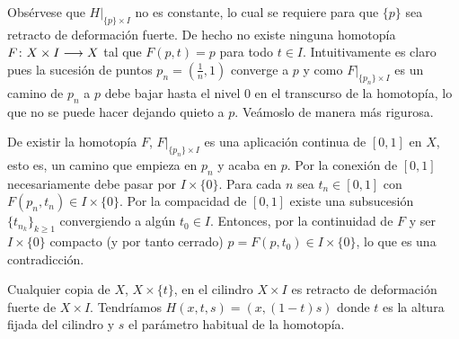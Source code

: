 \documentclass[GTS.tex]{subfiles}
\begin{document}
\begin{ej}
Obsérvese que $H\big|_{\{p\}\times I}$ no es constante, lo cual se requiere para que $\{p\}$ sea retracto de deformación fuerte. De hecho no existe ninguna homotopía $F\colon{X\times I}\longrightarrow{X}$ tal que $F(p,t)=p$ para todo $t\in I$. Intuitivamente es claro pues la sucesión de puntos $p_n=\left(\frac{1}{n},1\right)$ converge a $p$ y como $F\big|_{\{p_n\}\times I}$ es un camino de $p_n$ a $p$  debe bajar hasta el nivel $0$ en el transcurso de la homotopía, lo que no se puede hacer dejando quieto a $p$. Veámoslo de manera más rigurosa.

De existir la homotopía $F$, $F\big|_{\{p_n\}\times I}$ es una aplicación continua de $[0,1]$ en $X$, esto es, un camino que empieza en $p_n$ y acaba en $p$. Por la conexión de $[0,1]$ necesariamente debe pasar por $I\times\{0\}$. Para cada $n$ sea $t_n\in[0,1]$ con $F(p_n,t_n)\in I\times\{0\}$. Por la compacidad de $[0,1]$ existe una subsucesión $\{t_{n_k}\}_{k\geq 1}$ convergiendo a algún $t_0\in I$. Entonces, por la continuidad de $F$ y ser $I\times\{0\}$ compacto (y por tanto cerrado) $p=F(p,t_0)\in I\times\{0\}$, lo que es una contradicción.
\end{ej}

\begin{ej}Cualquier copia de $X$, $X\times\{t\}$, en el cilindro $X\times I$ es retracto de deformación fuerte de $X\times I$. Tendríamos $H(x,t,s)=(x,(1-t)s)$ donde $t$ es la altura fijada del cilindro y $s$ el parámetro habitual de la homotopía.

\begin{center}
\end{center}

\end{ej}
\end{document}
